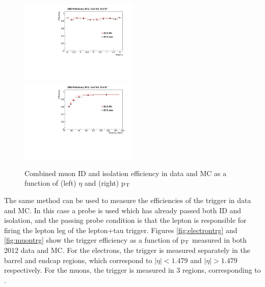 \begin{figure}[h!]
\includegraphics[width=0.5\textwidth]{plots/TagAndProbe/MuonIdIsoEta2012DatavsMC.pdf}
\includegraphics[width=0.5\textwidth]{plots/TagAndProbe/MuonIdIsoPT2012DatavsMC.pdf}
\caption{Combined muon ID and isolation efficiency in data and MC as a function
of (left) $\eta$ and (right) p$_{\rm{T}}$}
\label{fig:muonIdIso}
\end{figure}

\noindent The same method can be used to measure the efficiencies of the trigger
in data and MC. In this case a probe is used which has already passed both ID
and isolation, and the passing probe condition is that the lepton is responsible
for firing the lepton leg of the lepton+tau trigger. Figures
\ref{fig:electrontrg} and \ref{fig:muontrg} show the trigger efficiency as a
function of p$_{\rm{T}}$ measured in both 2012 data and MC. For the
electrons, the trigger is measured separately in the barrel and endcap
regions, which correspond to $|\eta| < 1.479$ and $|\eta| > 1.479$
respectively. For the muons, the trigger is measured in 3 regions, corresponding
to .

